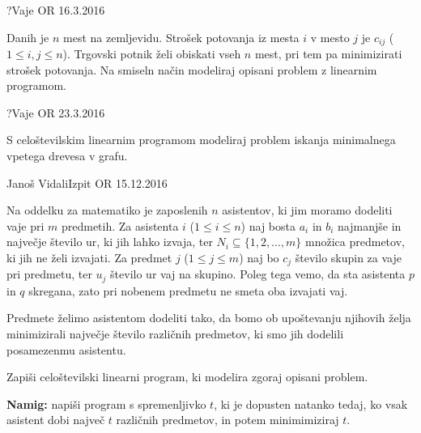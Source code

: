 \begin{naloga}{?}{Vaje OR 16.3.2016}
\begin{vprasanje}
Danih je $n$ mest na zemljevidu.
Strošek potovanja iz mesta $i$ v mesto $j$ je $c_{ij}$ ($1 \le i, j \le n$).
Trgovski potnik želi obiskati vseh $n$ mest,
pri tem pa minimizirati strošek potovanja.
Na smiseln način modeliraj opisani problem z linearnim programom.
\end{vprasanje}
\begin{odgovor}
\end{odgovor}
\end{naloga}


\begin{naloga}{?}{Vaje OR 23.3.2016}
\begin{vprasanje}
S celoštevilskim linearnim programom
modeliraj problem iskanja minimalnega vpetega drevesa v grafu.
\end{vprasanje}
\begin{odgovor}
\end{odgovor}
\end{naloga}


\begin{naloga}{Janoš Vidali}{Izpit OR 15.12.2016}
\begin{vprasanje}
Na oddelku za matematiko je zaposlenih $n$ asistentov,
ki jim moramo dodeliti vaje pri $m$ predmetih.
Za asistenta $i$ ($1 \le i \le n$) naj bosta $a_i$ in $b_i$
najmanjše in največje število ur, ki jih lahko izvaja,
ter $N_i \subseteq \{1, 2, \dots, m\}$ množica predmetov,
ki jih ne želi izvajati.
Za predmet $j$ ($1 \le j \le m$)
naj bo $c_j$ število skupin za vaje pri predmetu,
ter $u_j$ število ur vaj na skupino.
Poleg tega vemo, da sta asistenta $p$ in $q$ skregana,
zato pri nobenem predmetu ne smeta oba izvajati vaj.

Predmete želimo asistentom dodeliti tako,
da bomo ob upoštevanju njihovih želja
minimizirali največje število različnih predmetov,
ki smo jih dodelili posamezenmu asistentu.

Zapiši celoštevilski linearni program, ki modelira zgoraj opisani problem.


{\small {\bf Namig:} napiši program s spremenljivko $t$,
ki je dopusten natanko tedaj,
ko vsak asistent dobi največ $t$ različnih predmetov,
in potem minimimiziraj $t$.}
\end{vprasanje}
\begin{odgovor}
\end{odgovor}
\end{naloga}



